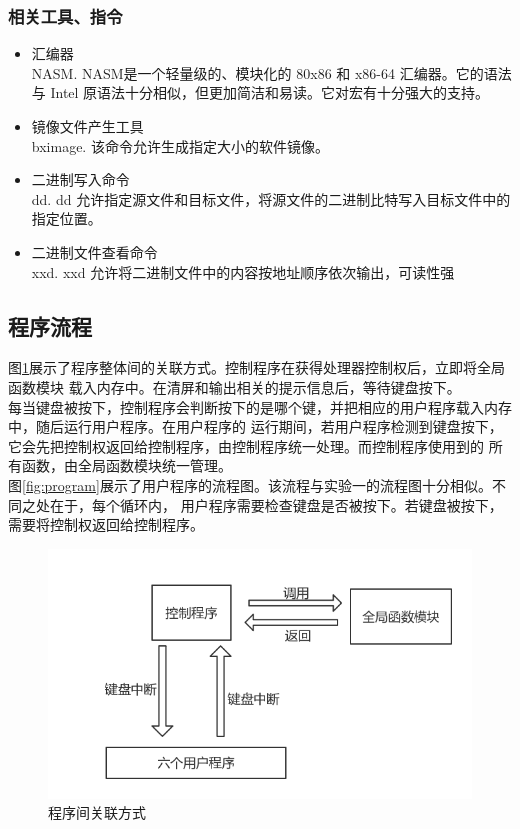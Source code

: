 \documentclass[a4paper]{article}
\begin{document}
    \subsubsection{相关工具、指令}
        \begin{itemize}
            \item 汇编器\\ 
            NASM. NASM是一个轻量级的、模块化的 80x86 和 x86-64 汇编器。它的语法与
            Intel 原语法十分相似，但更加简洁和易读。它对宏有十分强大的支持。
            \item 镜像文件产生工具\\ 
            bximage. 该命令允许生成指定大小的软件镜像。
            \item 二进制写入命令\\ 
            dd. dd 允许指定源文件和目标文件，将源文件的二进制比特写入目标文件中的指定位置。
            \item 二进制文件查看命令\\ 
            xxd. xxd 允许将二进制文件中的内容按地址顺序依次输出，可读性强
        \end{itemize}
    \subsection{程序流程}\label{subsec:programProcedure}
    图\ref{fig:overview}展示了程序整体间的关联方式。控制程序在获得处理器控制权后，立即将全局函数模块
    载入内存中。在清屏和输出相关的提示信息后，等待键盘按下。\\
    
    每当键盘被按下，控制程序会判断按下的是哪个键，并把相应的用户程序载入内存中，随后运行用户程序。在用户程序的
    运行期间，若用户程序检测到键盘按下，它会先把控制权返回给控制程序，由控制程序统一处理。而控制程序使用到的
    所有函数，由全局函数模块统一管理。\\
    
    图\ref{fig:program}展示了用户程序的流程图。该流程与实验一的流程图十分相似。不同之处在于，每个循环内，
    用户程序需要检查键盘是否被按下。若键盘被按下，需要将控制权返回给控制程序。

    
    \begin{figure}
        \begin{center}
        \includegraphics[scale=0.4]{assets/overview.png}
        \caption{程序间关联方式\label{fig:overview}}
        \end{center} 
    \end{figure} 
    
\end{document}
